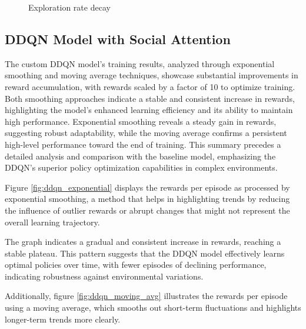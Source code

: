 \documentclass{article}
\begin{document}
\begin{figure}[ht]
\begin{minipage}{0.48\textwidth}
    \caption{Exploration rate decay}
    \label{fig:exploration_rate}
  \end{minipage}\hfill
\end{figure}

\subsection{DDQN Model with Social Attention}

The custom DDQN model's training results, analyzed through exponential smoothing and moving average techniques, showcase substantial improvements in reward accumulation, with rewards scaled by a factor of 10 to optimize training. Both smoothing approaches indicate a stable and consistent increase in rewards, highlighting the model's enhanced learning efficiency and its ability to maintain high performance. Exponential smoothing reveals a steady gain in rewards, suggesting robust adaptability, while the moving average confirms a persistent high-level performance toward the end of training. This summary precedes a detailed analysis and comparison with the baseline model, emphasizing the DDQN's superior policy optimization capabilities in complex environments.

Figure \ref{fig:ddqn_exponential} displays the rewards per episode as processed by exponential smoothing, a method that helps in highlighting trends by reducing the influence of outlier rewards or abrupt changes that might not represent the overall learning trajectory.

The graph indicates a gradual and consistent increase in rewards, reaching a stable plateau. This pattern suggests that the DDQN model effectively learns optimal policies over time, with fewer episodes of declining performance, indicating robustness against environmental variations.

Additionally, figure \ref{fig:ddqn_moving_avg} illustrates the rewards per episode using a moving average, which smooths out short-term fluctuations and highlights longer-term trends more clearly.
\end{document}
